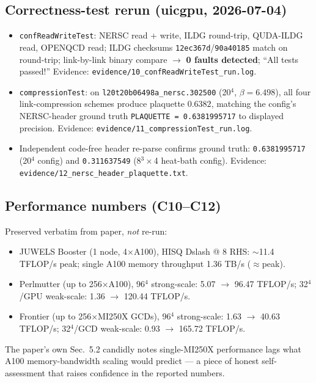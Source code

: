 \documentclass[11pt]{article}
\begin{document}
\subsection{Correctness-test rerun (uicgpu, 2026-07-04)}
\begin{itemize}[leftmargin=1.5em]
  \item \texttt{confReadWriteTest}: NERSC read + write, ILDG round-trip, QUDA-ILDG read, OPENQCD read; ILDG checksums \texttt{12ec367d}/\texttt{90a40185} match on round-trip; link-by-link binary compare $\rightarrow$ \textbf{0 faults detected}; ``All tests passed!'' Evidence: \texttt{evidence/10\_confReadWriteTest\_run.log}.
  \item \texttt{compressionTest}: on \texttt{l20t20b06498a\_nersc.302500} (20$^4$, $\beta{=}6.498$), all four link-compression schemes produce plaquette $\mathbf{0.6382}$, matching the config's NERSC-header ground truth \texttt{PLAQUETTE = 0.6381995717} to displayed precision. Evidence: \texttt{evidence/11\_compressionTest\_run.log}.
  \item Independent code-free header re-parse confirms ground truth: \texttt{0.6381995717} (20$^4$ config) and \texttt{0.311637549} (8$^3\times$4 heat-bath config). Evidence: \texttt{evidence/12\_nersc\_header\_plaquette.txt}.
\end{itemize}

\subsection{Performance numbers (C10--C12)}
Preserved verbatim from paper, \emph{not} re-run:
\begin{itemize}[leftmargin=1.5em]
  \item JUWELS Booster (1 node, 4$\times$A100), HISQ Dslash @ 8 RHS: $\sim$11.4 TFLOP/s peak; single A100 memory throughput 1.36 TB/s ($\approx$peak).
  \item Perlmutter (up to 256$\times$A100), 96$^4$ strong-scale: 5.07 $\rightarrow$ 96.47 TFLOP/s; 32$^4$/GPU weak-scale: 1.36 $\rightarrow$ 120.44 TFLOP/s.
  \item Frontier (up to 256$\times$MI250X GCDs), 96$^4$ strong-scale: 1.63 $\rightarrow$ 40.63 TFLOP/s; 32$^4$/GCD weak-scale: 0.93 $\rightarrow$ 165.72 TFLOP/s.
\end{itemize}
The paper's own Sec.~5.2 candidly notes single-MI250X performance lags what A100 memory-bandwidth scaling would predict --- a piece of honest self-assessment that raises confidence in the reported numbers.
\end{document}
